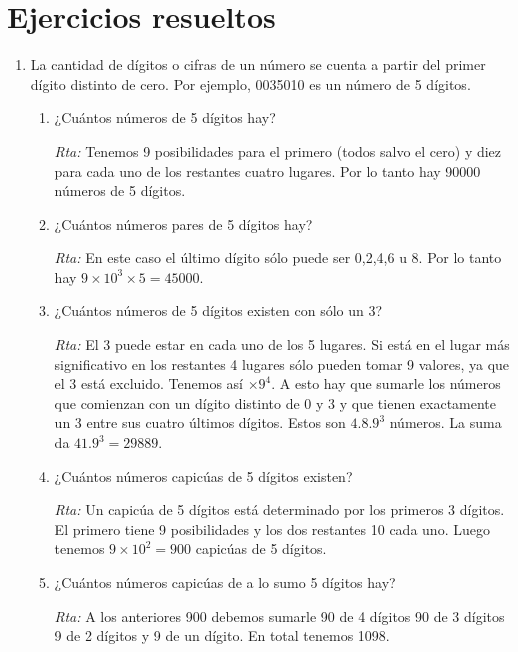 \chapter{Ejercicios resueltos}\label{ej-resueltos-2}
\begin{enumerate}
    \item  La cantidad de dígitos o cifras de un número se cuenta a partir del primer dígito
    distinto de cero. Por ejemplo, 0035010 es un número de 5 dígitos.
    \begin{enumerate}
    \item ¿Cuántos números de 5 dígitos hay?
    
    \textit{Rta:} Tenemos 9 posibilidades para el primero (todos salvo el cero) y diez para cada uno de los restantes cuatro lugares. Por lo tanto hay 90000 números de 5 dígitos.
    
    \item ¿Cuántos números pares de 5 dígitos hay?
    
    \textit{Rta:} En este caso el último dígito sólo puede ser 0,2,4,6 u 8. Por lo tanto hay $9\times 10^3\times 5= 45000$.
    
    \item ¿Cuántos números de 5 dígitos existen con sólo un 3?
    
    \noindent\textit{Rta:} El 3 puede estar en cada uno de los 5 lugares. Si está en el lugar más significativo en los restantes 4 lugares sólo pueden tomar 9 valores, ya que el 3 está excluido. Tenemos así $\times 9^4.$ A esto hay que sumarle los números que comienzan con un dígito distinto de 0 y 3 y que tienen exactamente un 3 entre sus cuatro últimos dígitos. Estos son $4.8.9^3$ números. La suma da $41.9^3=29889$.
    
    \item ¿Cuántos números capicúas de 5 dígitos existen?
    
    \textit{Rta:} Un capicúa de 5 dígitos está determinado por los primeros 3 dígitos. El primero tiene 9 posibilidades y los dos restantes 10 cada uno. Luego tenemos $9\times 10^2=900 $ capicúas de 5 dígitos.
    
    \item ¿Cuántos números capicúas de a lo sumo 5 dígitos hay?
    
    \textit{Rta:} A los anteriores 900 debemos sumarle 90 de 4 dígitos 90 de 3 dígitos 9 de 2 dígitos y 9 de un dígito. En total tenemos 1098.
     
    \end{enumerate}
    

\end{enumerate}
